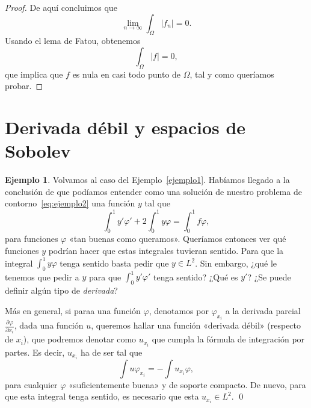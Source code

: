 \documentclass[12pt,a4paper]{book}
\theoremstyle{definition} \newtheorem{defn}[thm]{Definición}
\theoremstyle{definition} \newtheorem{ejemplo}[thm]{Ejemplo}
\theoremstyle{definition} \newtheorem{ejercicio}[thm]{Ejercicio}
\theoremstyle{remark} \newtheorem*{obs}{Observación}
\begin{document}
\begin{proof}
  De aquí concluimos que 
  \begin{equation*}
    \lim_{n\rightarrow \infty} \int_\Omega |f_n| = 0.
  \end{equation*}
  Usando el lema de Fatou, obtenemos 
  \begin{equation*}
    \int_\Omega |f| =0,
  \end{equation*}
  que implica que $f$ es nula en casi todo punto de $\Omega$, tal y como queríamos probar.
\end{proof}

\section{Derivada débil y espacios de Sobolev}
\begin{ejemplo}
  Volvamos al caso del Ejemplo~\ref{ejemplo1}. Habíamos llegado a la conclusión de que podíamos entender como una solución de nuestro problema de contorno~\eqref{eq:ejemplo2} una función $y$ tal que
  \begin{equation*}
    \int_0^1 y'\varphi'+2 \int_0^1 y \varphi = \int_0^1 f \varphi,
  \end{equation*}
  para funciones $\varphi$ «tan buenas como queramos». Queríamos entonces ver qué funciones $y$ podrían hacer que estas integrales tuvieran sentido. Para que la integral $\int_0^1 y \varphi$ tenga sentido basta pedir que $y\in L^2$. Sin embargo, ¿qué le tenemos que pedir a $y$ para que $\int_0^1 y'\varphi'$ tenga sentido? ¿Qué es $y'$? ¿Se puede definir algún tipo de \emph{derivada}?

  Más en general, si paraa una función $\varphi$, denotamos por $\varphi_{x_i}$ a la derivada parcial $\frac{\partial \varphi}{\partial x_i}$, dada una función $u$, queremos hallar una función «derivada débil» (respecto de $x_i$), que podremos denotar como $u_{x_i}$ que cumpla la fórmula de integración por partes. Es decir, $u_{x_i}$ ha de ser tal que
  \begin{equation*}
    \int u \varphi_{x_i}=-\int u_{x_i} \varphi,
  \end{equation*}
  para cualquier $\varphi$ «suficientemente buena» y de soporte compacto. De nuevo, para que esta integral tenga sentido, es necesario que esta $u_{x_i}\in L^2$. \qed
\end{ejemplo}
\end{document}
